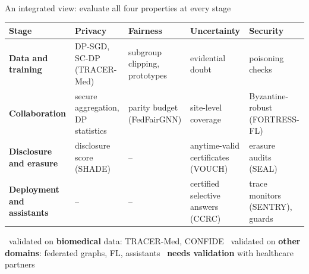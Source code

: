 \documentclass[aspectratio=169,10pt]{beamer}
\begin{document}
\begin{frame}{An integrated view: evaluate all four properties at every stage}
\footnotesize\renewcommand{\arraystretch}{1.08}
\begin{tabularx}{\textwidth}{@{}>{\raggedright\bfseries}p{26mm}>{\centering}X>{\centering}X>{\centering}X>{\centering\arraybackslash}X@{}}
\toprule
\normalsize Stage & \normalsize Privacy & \normalsize Fairness & \normalsize Uncertainty & \normalsize Security\\
\midrule
Data and training & \textcolor{tdBlue}{DP-SGD, SC-DP} (TRACER-Med) & subgroup clipping, prototypes & evidential doubt & poisoning checks\\
Collaboration & secure aggregation, DP statistics & parity budget (FedFairGNN) & site-level coverage & Byzantine-robust (FORTRESS-FL)\\
Disclosure and erasure & disclosure score (SHADE) & -- & anytime-valid certificates (VOUCH) & erasure audits (SEAL)\\
Deployment and assistants & -- & -- & certified selective answers (CCRC) & trace monitors (SENTRY), guards\\
\bottomrule
\end{tabularx}

\vspace{1mm}
{\scriptsize \faHeartbeat\ validated on \textbf{biomedical} data: TRACER-Med, CONFIDE \quad \faProjectDiagram\ validated on \textbf{other domains}: federated graphs, FL, assistants \quad \faHandshake\ \textbf{needs validation} with healthcare partners}
\end{frame}
\end{document}
